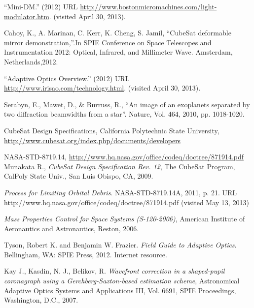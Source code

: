 \documentclass[12pt]{article}
\begin{document}
\begin{thebibliography}{9}




“Mini-DM.” (2012) URL \url{http://www.bostonmicromachines.com/light-modulator.htm}. (visited April 30, 2013).

Cahoy, K., A. Marinan, C. Kerr, K. Cheng, S. Jamil, “CubeSat deformable mirror demonstration,”.In SPIE Conference on Space Telescopes and Instrumentation 2012: Optical, Infrared, and Millimeter Wave. Amsterdam, Netherlands,2012.

“Adaptive Optics Overview.” (2012) URL \url{http://www.irisao.com/technology.html}. (visited April 30, 2013).

Serabyn, E., Mawet, D., \& Burruss, R., ``An image of an exoplanets separated by two diffraction beamwidths from a star''. Nature, Vol. 464, 2010, pp. 1018-1020.

CubeSat Design Specifications, California Polytechnic State University, \url{http://www.cubesat.org/index.php/documents/developers}

NASA-STD-8719.14, \url{http://www.hq.nasa.gov/office/codeq/doctree/871914.pdf}
Munakata R., \emph{CubeSat Design Specification Rev. 12}, The CubeSat Program, CalPoly State Univ., San Luis Obispo, CA, 2009.

\emph{Process for Limiting Orbital Debris}. NASA-STD-8719.14A, 2011, p. 21. URL http://www.hq.nasa.gov/office/codeq/doctree/871914.pdf (visited May 13, 2013)

\emph{Mass Properties Control for Space Systems (S-120-2006)}, American Institute of Aeronautics and Astronautics, Reston, 2006.


   Tyson, Robert K. and Benjamin W. Frazier. 
   \emph{Field Guide to Adaptive Optics}. Bellingham, WA: SPIE Press,
   2012.  Internet resource.

   Kay J., Kasdin, N. J., Belikov, R.
   \emph{Wavefront correction in a shaped-pupil coronagraph using a Gerchberg-Saxton-based estimation scheme}, Astronomical Adaptive Optics Systems and Applications III, Vol. 6691, SPIE Proceedings, Washington, D.C., 2007.


\end{thebibliography}
\end{document}
